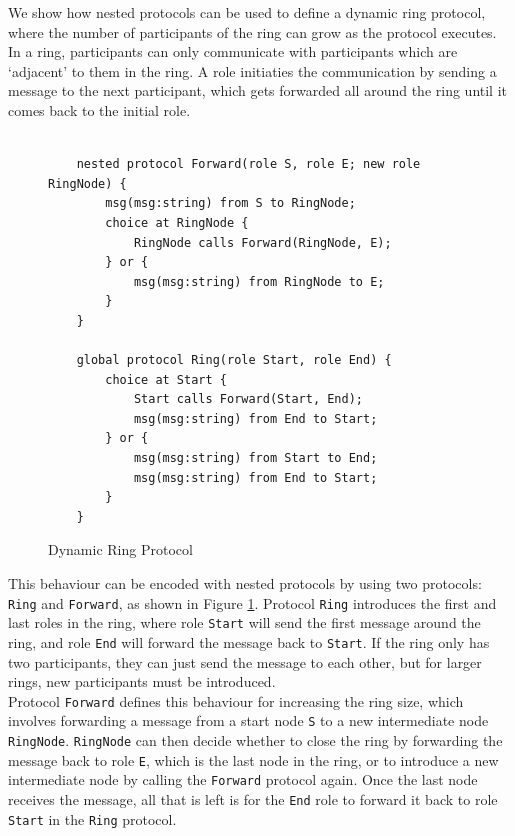 \documentclass[12pt,twoside]{report}
\begin{document}
We show how nested protocols can be used to define a dynamic ring protocol, where the number of participants of the ring can grow as the protocol executes. In a ring, participants can only communicate with participants which are `adjacent' to them in the ring. A role initiaties the communication by sending a message to the next participant, which gets forwarded all around the ring until it comes back to the initial role.

\begin{figure}[htb!]
    \centering
    \lstset{language=Scribble}
    \begin{lstlisting}
    
    nested protocol Forward(role S, role E; new role RingNode) {
        msg(msg:string) from S to RingNode;
        choice at RingNode {
            RingNode calls Forward(RingNode, E);
        } or {
            msg(msg:string) from RingNode to E;
        }
    }
        
    global protocol Ring(role Start, role End) {
        choice at Start {
            Start calls Forward(Start, End);
            msg(msg:string) from End to Start;
        } or {
            msg(msg:string) from Start to End;
            msg(msg:string) from End to Start;
        }
    }
    \end{lstlisting}
    \caption{Dynamic Ring Protocol}
    \label{ring-protocol}
\end{figure}{}

This behaviour can be encoded with nested protocols by using two protocols: \texttt{Ring} and \texttt{Forward}, as shown in Figure \ref{ring-protocol}. Protocol \texttt{Ring} introduces the first and last roles in the ring, where role \texttt{Start} will send the first message around the ring, and role \texttt{End} will forward the message back to \texttt{Start}. If the ring only has two participants, they can just send the message to each other, but for larger rings, new participants must be introduced.\\

Protocol \texttt{Forward} defines this behaviour for increasing the ring size, which involves forwarding a message from a start node \texttt{S} to a new intermediate node \texttt{RingNode}. \texttt{RingNode} can then decide whether to close the ring by forwarding the message back to role \texttt{E}, which is the last node in the ring, or to introduce a new intermediate node by calling the \texttt{Forward} protocol again. Once the last node receives the message, all that is left is for the \texttt{End} role to forward it back to role \texttt{Start} in the \texttt{Ring} protocol. 
\end{document}

